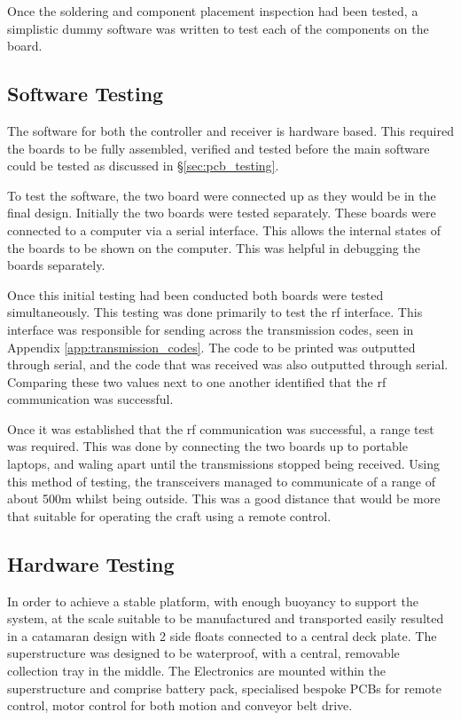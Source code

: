 \documentclass [11pt]{article}
\begin{document}
Once the soldering and component placement inspection had been tested, a simplistic dummy software was written to test each of the components on the board. 

\subsection{Software Testing}

The software for both the controller and receiver is hardware based. This required the boards to be fully assembled, verified and tested before the main software could be tested as discussed in §\ref{sec:pcb_testing}. 

To test the software, the two board were connected up as they would be in the final design. Initially the two boards were tested separately. These boards were connected to a computer via a serial interface. This allows the internal states of the boards to be shown on the computer. This was helpful in debugging the boards separately. 

Once this initial testing had been conducted both boards were tested simultaneously. This testing was done primarily to test the \gls{rf} interface. This interface was responsible for sending across the transmission codes, seen in Appendix \ref{app:transmission_codes}. The code to be printed was outputted through serial, and the code that was received was also outputted through serial. Comparing these two values next to one another identified that the \gls{rf} communication was successful. 

Once it was established that the \gls{rf} communication was successful, a range test was required. This was done by connecting the two boards up to portable laptops, and waling apart until the transmissions stopped being received. Using this method of testing, the transceivers managed to communicate of a range of about 500m whilst being outside. This was a good distance that would be more that suitable for operating the craft using a remote control.  

\subsection{Hardware Testing}

In order to achieve a stable platform, with enough buoyancy to support the system, at the scale suitable to be manufactured and transported easily resulted in a catamaran design with 2 side floats connected to a central deck plate.
The superstructure was designed to be waterproof, with a central, removable collection tray in the middle.
The Electronics are mounted within the superstructure and comprise battery pack, specialised bespoke PCBs for remote control, motor control for both motion and conveyor belt drive.
\end{document}
